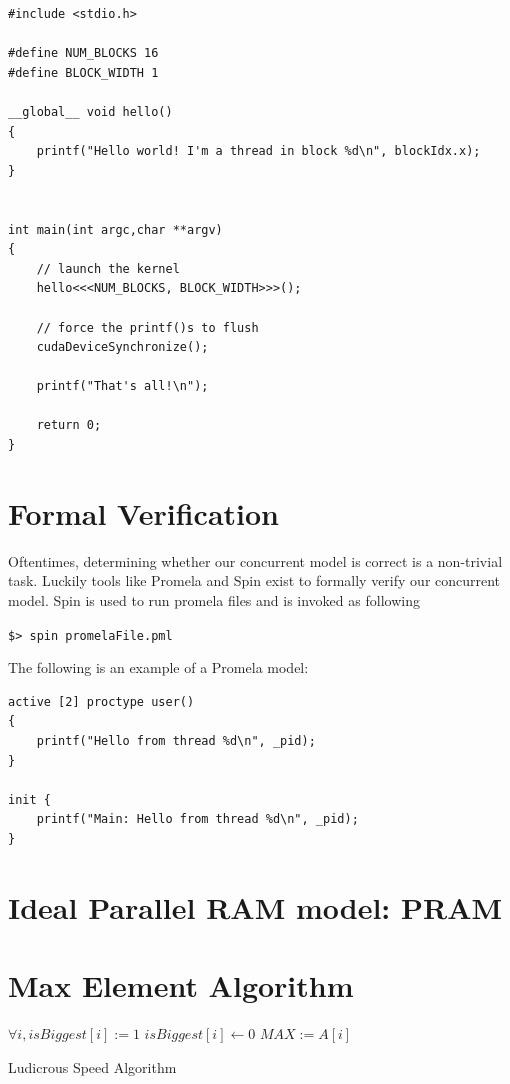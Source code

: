 \documentclass[twoside]{article}
\begin{document}
\begin{lstlisting}
#include <stdio.h>

#define NUM_BLOCKS 16
#define BLOCK_WIDTH 1

__global__ void hello()
{
    printf("Hello world! I'm a thread in block %d\n", blockIdx.x);
}


int main(int argc,char **argv)
{
    // launch the kernel
    hello<<<NUM_BLOCKS, BLOCK_WIDTH>>>();

    // force the printf()s to flush
    cudaDeviceSynchronize();

    printf("That's all!\n");

    return 0;
}
\end{lstlisting}

\section{Formal Verification}
Oftentimes, determining whether our concurrent model is correct is a non-trivial task. Luckily tools like Promela and Spin exist to formally verify our concurrent model. Spin is used to run promela files and is invoked as following 

\texttt{\$> spin promelaFile.pml}

The following is an example of a Promela model:
\begin{lstlisting}
active [2] proctype user()
{
    printf("Hello from thread %d\n", _pid);
}

init {
    printf("Main: Hello from thread %d\n", _pid);
}
\end{lstlisting}

\section{Ideal Parallel RAM model: PRAM}


\section{Max Element Algorithm}

\begin{algorithm}
    \begin{algorithmic}[]
	\State $\forall i, isBiggest[i] := 1$
            	\State $isBiggest[i] \gets 0$
	    \EndIf
        \EndFor
	   \State $MAX := A[i]$
	\EndIf
    \end{algorithmic}
    \caption{Ludicrous Speed Algorithm}
\end{algorithm}
\end{document}
